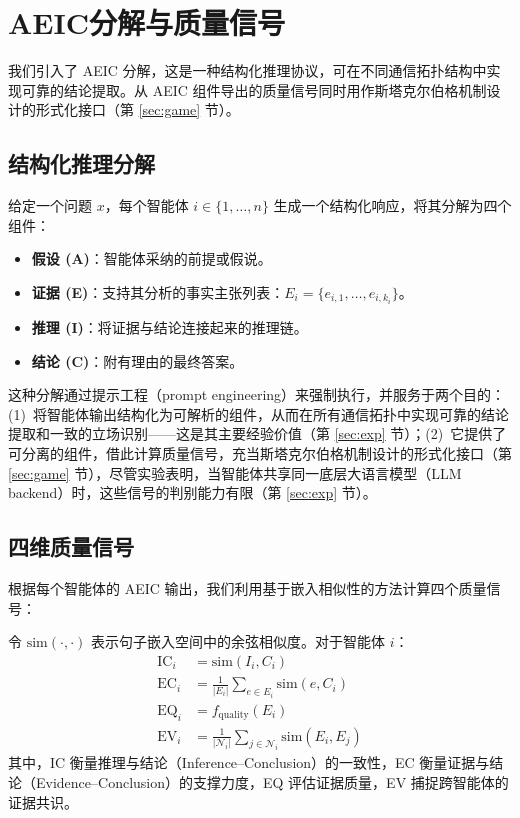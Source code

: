 \section{AEIC分解与质量信号}
\label{sec:aeic}

我们引入了 AEIC 分解，这是一种结构化推理协议，可在不同通信拓扑结构中实现可靠的结论提取。从 AEIC 组件导出的质量信号同时用作斯塔克尔伯格机制设计的形式化接口（第 \ref{sec:game} 节）。

\subsection{结构化推理分解}

给定一个问题 $x$，每个智能体 $i \in \{1, \ldots, n\}$ 生成一个结构化响应，将其分解为四个组件：

\begin{itemize}
    \item \textbf{假设 (A)}：智能体采纳的前提或假说。
    \item \textbf{证据 (E)}：支持其分析的事实主张列表：$E_i = \{e_{i,1}, \ldots, e_{i,k_i}\}$。
    \item \textbf{推理 (I)}：将证据与结论连接起来的推理链。
    \item \textbf{结论 (C)}：附有理由的最终答案。
\end{itemize}

这种分解通过提示工程（prompt engineering）来强制执行，并服务于两个目的：(1)~将智能体输出结构化为可解析的组件，从而在所有通信拓扑中实现可靠的结论提取和一致的立场识别——这是其主要经验价值（第 \ref{sec:exp} 节）；(2)~它提供了可分离的组件，借此计算质量信号，充当斯塔克尔伯格机制设计的形式化接口（第 \ref{sec:game} 节），尽管实验表明，当智能体共享同一底层大语言模型（LLM backend）时，这些信号的判别能力有限（第 \ref{sec:exp} 节）。

\subsection{四维质量信号}

根据每个智能体的 AEIC 输出，我们利用基于嵌入相似性的方法计算四个质量信号：

\begin{definition}[质量信号]
令 $\mathrm{sim}(\cdot, \cdot)$ 表示句子嵌入空间中的余弦相似度。对于智能体 $i$：
\begin{align}
    \mathrm{IC}_i &= \mathrm{sim}(I_i, C_i) \\
    \mathrm{EC}_i &= \tfrac{1}{|E_i|}\textstyle\sum_{e \in E_i} \mathrm{sim}(e, C_i) \\
    \mathrm{EQ}_i &= f_{\mathrm{quality}}(E_i) \\
    \mathrm{EV}_i &= \tfrac{1}{|\mathcal{N}_i|}\textstyle\sum_{j \in \mathcal{N}_i} \mathrm{sim}(E_i, E_j)
\end{align}
其中，IC 衡量推理与结论（Inference--Conclusion）的一致性，EC 衡量证据与结论（Evidence--Conclusion）的支撑力度，EQ 评估证据质量，EV 捕捉跨智能体的证据共识。
\end{definition}

